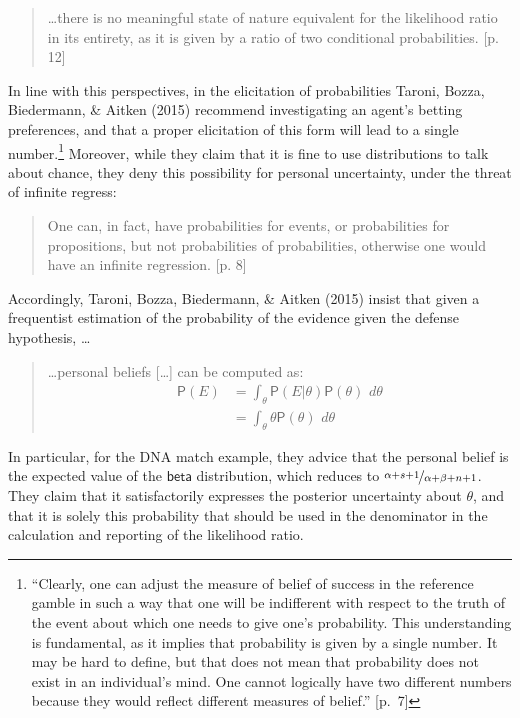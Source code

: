 \documentclass[
  10pt,
  dvipsnames,enabledeprecatedfontcommands]{scrartcl}
\newcommand{\pr}[1]{\mathsf{P}(#1)}
\newcommand{\s}[1]{\mbox{$\mathsf{#1}$}}
\begin{document}
\begin{quote}
\dots there is no meaningful state of nature equivalent for the likelihood ratio in its entirety, as it is given by a ratio of two conditional probabilities. [p. 12]
\end{quote}

\noindent In line with this perspectives, in the elicitation of
probabilities Taroni, Bozza, Biedermann, \& Aitken (2015) recommend
investigating an agent's betting preferences, and that a proper
elicitation of this form will lead to a single number.\footnote{``Clearly,
  one can adjust the measure of belief of success in the reference
  gamble in such a way that one will be indifferent with respect to the
  truth of the event about which one needs to give one's probability.
  This understanding is fundamental, as it implies that probability is
  given by a single number. It may be hard to define, but that does not
  mean that probability does not exist in an individual's mind. One
  cannot logically have two different numbers because they would reflect
  different measures of belief.'' {[}p.~7{]}} \noindent Moreover, while
they claim that it is fine to use distributions to talk about chance,
they deny this possibility for personal uncertainty, under the threat of
infinite regress:

\begin{quote}
One can, in fact, have probabilities for events, or probabilities for propositions, but not probabilities of probabilities, otherwise one would have an infinite regression. [p. 8]
\end{quote}

\noindent Accordingly, Taroni, Bozza, Biedermann, \& Aitken (2015)
insist that given a frequentist estimation of the probability of the
evidence given the defense hypothesis, \dots

\begin{quote}
\dots personal beliefs [\dots] can be computed as:
\begin{align*}\pr{E} & = \int_{\theta} \pr{E\vert \theta} \pr{\theta}\,\, d\theta \\
& =  \int_\theta  \theta \pr{\theta}\,\, d\theta
\end{align*}
\end{quote}

\noindent In particular, for the DNA match example, they advice that the
personal belief is the expected value of the \(\s{beta}\) distribution,
which reduces to \(\nicefrac{\alpha + s + 1}{\alpha + \beta +n + 1}\).
They claim that it satisfactorily expresses the posterior uncertainty
about \(\theta\), and that it is solely this probability that should be
used in the denominator in the calculation and reporting of the
likelihood ratio.
\end{document}
